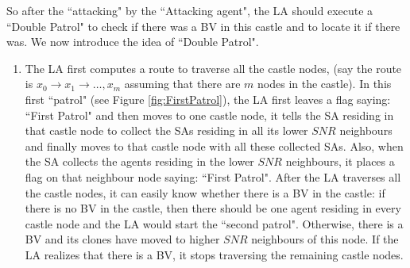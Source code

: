 So after the ``attacking" by the ``Attacking agent", the LA should execute a ``Double Patrol"   to check if there was a BV in this castle and to  locate it if there was.  We  now introduce the idea of   ``Double Patrol".
\begin{enumerate}
\item 
The LA first computes a route to traverse all the castle nodes, (say the route is $x_0\rightarrow x_1 \rightarrow\ldots, x_m$ assuming that there are $m$ nodes in the castle). In this first ``patrol" (see Figure \ref{fig:FirstPatrol}), the LA first leaves a flag saying: ``First Patrol" and then moves to one castle node, it tells the SA residing in that castle node to collect the SAs residing in all its lower $SNR$ neighbours and finally moves to that castle node with all these collected SAs. Also, when the SA collects the agents  residing in the lower $SNR$ neighbours, it places a flag on that neighbour node saying: ``First Patrol". After the LA traverses all the castle nodes, it can easily know whether there is a BV in the castle: if there is no BV in the castle, then there should be one agent residing in every castle node and the LA would start the ``second patrol". Otherwise, there is a BV and its clones  have moved   to higher $SNR$ neighbours of this node. If the LA realizes that there is a BV, it stops traversing the remaining castle nodes.\\ 


\end{enumerate}

